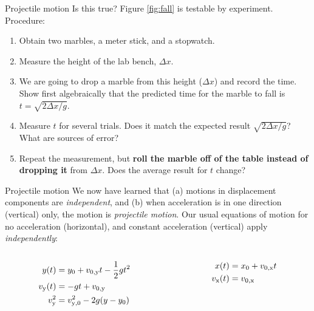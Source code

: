 \documentclass{beamer}
\begin{document}
\begin{frame}{Projectile motion}
Is this true?  Figure \ref{fig:fall} is testable by experiment. \\
\vspace{0.5cm}
\small
Procedure:
\begin{enumerate}
\item Obtain two marbles, a meter stick, and a stopwatch.
\item Measure the height of the lab bench, $\Delta x$.
\item We are going to drop a marble from this height ($\Delta x$) and record the time.  Show first algebraically that the predicted time for the marble to fall is $t = \sqrt{2\Delta x/g}$.
\item Measure $t$ for several trials.  Does it match the expected result $\sqrt{2\Delta x/g}$?  What are sources of error?
\item Repeat the measurement, but \textbf{roll the marble off of the table instead of dropping it} from $\Delta x$.  Does the average result for $t$ change?
\end{enumerate}
\end{frame}

\begin{frame}{Projectile motion}
\small
We now have learned that (a) motions in displacement components are \textit{independent}, and (b) when acceleration is in \alert{one direction} (vertical) only, the motion is \textit{projectile motion}.  Our usual equations of motion for no acceleration (horizontal), and constant acceleration (vertical) apply \textit{independently}:
\begin{columns}[T]
\begin{column}{0.5\textwidth}
\begin{align}
y(t) &= y_{\rm 0} + v_{\rm 0,y} t - \frac{1}{2}gt^2 \label{eq:main1} \\
v_{\rm y}(t) &= -gt+v_{\rm 0,y} \label{eq:main2} \\
v_{\rm y}^2 &= v_{\rm y,0}^2 - 2g(y-y_{\rm 0}) \label{eq:main3}
\end{align}
\end{column}
\begin{column}{0.5\textwidth}
\begin{align}
x(t) &= x_{\rm 0} + v_{\rm 0,x}t \label{eq:main4} \\
v_{\rm x}(t) &= v_{\rm 0,x} \label{eq:main5}
\end{align}
\end{column}
\end{columns}
\end{frame}
\end{document}
